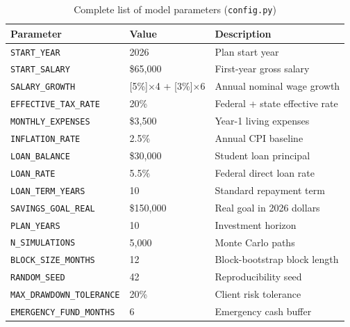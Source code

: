\documentclass[12pt, letterpaper]{article}
\begin{document}
\begin{table}[H]
  \centering
  \caption{Complete list of model parameters (\texttt{config.py})}
  \label{tab:params}
  \begin{tabular}{llp{6.2cm}}
    \toprule
    \textbf{Parameter} & \textbf{Value} & \textbf{Description} \\
    \midrule
    \texttt{START\_YEAR}              & 2026       & Plan start year \\
    \texttt{START\_SALARY}            & \$65{,}000 & First-year gross salary \\
    \texttt{SALARY\_GROWTH}           & [5\%]$\times$4 + [3\%]$\times$6 & Annual nominal wage growth \\
    \texttt{EFFECTIVE\_TAX\_RATE}     & 20\%       & Federal + state effective rate \\
    \texttt{MONTHLY\_EXPENSES}        & \$3{,}500  & Year-1 living expenses \\
    \texttt{INFLATION\_RATE}          & 2.5\%      & Annual CPI baseline \\
    \texttt{LOAN\_BALANCE}            & \$30{,}000 & Student loan principal \\
    \texttt{LOAN\_RATE}               & 5.5\%      & Federal direct loan rate \\
    \texttt{LOAN\_TERM\_YEARS}        & 10         & Standard repayment term \\
    \texttt{SAVINGS\_GOAL\_REAL}      & \$150{,}000 & Real goal in 2026 dollars \\
    \texttt{PLAN\_YEARS}              & 10         & Investment horizon \\
    \texttt{N\_SIMULATIONS}           & 5{,}000    & Monte Carlo paths \\
    \texttt{BLOCK\_SIZE\_MONTHS}      & 12         & Block-bootstrap block length \\
    \texttt{RANDOM\_SEED}             & 42         & Reproducibility seed \\
    \texttt{MAX\_DRAWDOWN\_TOLERANCE} & 20\%       & Client risk tolerance \\
    \texttt{EMERGENCY\_FUND\_MONTHS}  & 6          & Emergency cash buffer \\
    \bottomrule
  \end{tabular}
\end{table}
\end{document}
